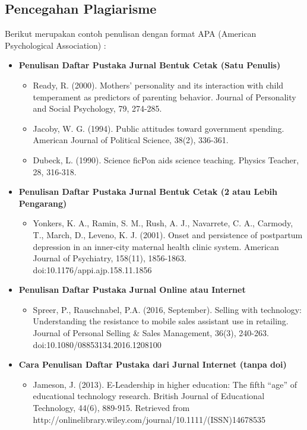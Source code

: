 \subsection{Pencegahan Plagiarisme}
Berikut merupakan contoh penulisan dengan format APA (American Psychological Association) :
\begin{itemize}
    \item \textbf{Penulisan Daftar Pustaka Jurnal Bentuk Cetak (Satu Penulis)}
    \begin{itemize}
        \item Ready, R. (2000). Mothers’ personality and its interaction with child temperament as predictors of parenting behavior. Journal of Personality and Social Psychology, 79, 274-285.
        \item Jacoby, W. G. (1994). Public attitudes toward government spending. American Journal of Political Science, 38(2), 336-361.
        \item  Dubeck, L. (1990). Science ﬁcPon aids science teaching. Physics Teacher, 28, 316-318.
    \end{itemize}
    \item \textbf{Penulisan Daftar Pustaka Jurnal Bentuk Cetak (2 atau Lebih Pengarang)}
    \begin{itemize}
        \item Yonkers, K. A., Ramin, S. M., Rush, A. J., Navarrete, C. A., Carmody, T., March, D., Leveno, K. J. (2001). Onset and persistence of postpartum depression in an inner-city maternal health clinic system. American Journal of Psychiatry, 158(11), 1856-1863. doi:10.1176/appi.ajp.158.11.1856        
    \end{itemize}
    \item \textbf{Penulisan Daftar Pustaka Jurnal Online atau Internet}
    \begin{itemize}
        \item Spreer, P., Rauschnabel, P.A. (2016, September). Selling with technology: Understanding the resistance to mobile sales assistant use in retailing. Journal of Personal Selling \& Sales Management, 36(3), 240-263. doi:10.1080/08853134.2016.1208100        
    \end{itemize}
    \item \textbf{Cara Penulisan Daftar Pustaka dari Jurnal Internet (tanpa doi)}
    \begin{itemize}
        \item Jameson, J. (2013). E-Leadership in higher education: The ﬁfth “age” of educational technology research. British Journal of Educational Technology, 44(6), 889-915. Retrieved from http://onlinelibrary.wiley.com/journal/10.1111/(ISSN)14678535       
    \end{itemize}
\end{itemize}



